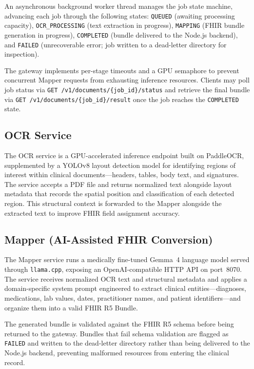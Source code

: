 An asynchronous background worker thread manages the job state machine,
advancing each job through the following states: \texttt{QUEUED} (awaiting
processing capacity), \texttt{OCR\_PROCESSING} (text extraction in
progress), \texttt{MAPPING} (FHIR bundle generation in progress),
\texttt{COMPLETED} (bundle delivered to the Node.js backend), and
\texttt{FAILED} (unrecoverable error; job written to a dead-letter directory
for inspection).

The gateway implements per-stage timeouts and a GPU semaphore to prevent
concurrent Mapper requests from exhausting inference resources. Clients may
poll job status via \texttt{GET /v1/documents/\{job\_id\}/status} and
retrieve the final bundle via \texttt{GET /v1/documents/\{job\_id\}/result}
once the job reaches the \texttt{COMPLETED} state.

\subsection{OCR Service}

The OCR service is a GPU-accelerated inference endpoint built on PaddleOCR,
supplemented by a YOLOv8 layout detection model for identifying regions of
interest within clinical documents---headers, tables, body text, and
signatures. The service accepts a PDF file and returns normalized text
alongside layout metadata that records the spatial position and
classification of each detected region. This structural context is forwarded
to the Mapper alongside the extracted text to improve FHIR field assignment
accuracy.

\subsection{Mapper (AI-Assisted FHIR Conversion)}

The Mapper service runs a medically fine-tuned Gemma~4 language model served
through \texttt{llama.cpp}, exposing an OpenAI-compatible HTTP API on
port~8070. The service receives normalized OCR text and structural metadata
and applies a domain-specific system prompt engineered to extract clinical
entities---diagnoses, medications, lab values, dates, practitioner names, and
patient identifiers---and organize them into a valid FHIR R5 Bundle.

The generated bundle is validated against the FHIR R5 schema before being
returned to the gateway. Bundles that fail schema validation are flagged as
\texttt{FAILED} and written to the dead-letter directory rather than being
delivered to the Node.js backend, preventing malformed resources from
entering the clinical record.
